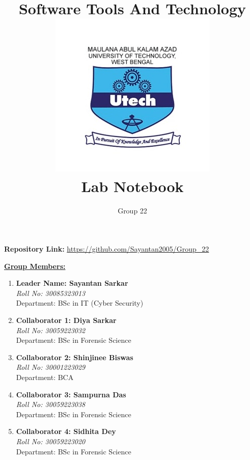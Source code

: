\documentclass[12pt, a4paper]{article}
\title{
    \vspace{-2cm}
    \Huge \textbf{\color{blue!60} Software Tools And Technology}\\[0.5cm]
    \includegraphics[width=0.3\linewidth]{Makaut.png}\\[0.5cm]
    \LARGE \textbf{\color{black} Lab Notebook}
}
\author{
    \vspace{1cm}
    \Large Group 22
}
\date{} %
\begin{document}
\maketitle
{}


\vspace{-1cm}
\begin{center}
    \textbf{Repository Link:} \href{https://github.com/Sayantan2005/Group\_22}{\textcolor{blue!60}{https://github.com/Sayantan2005/Group\_22}}
\end{center}

\vspace{1cm}

\centering
\bfseries{\underline{\Large \textcolor{blue!60}{Group Members:}}}
\vspace{0.5cm}

\begin{flushleft}
\begin{enumerate}
    \item \textbf{Leader Name: Sayantan Sarkar}\\
    \textit{Roll No: 30085323013} \\
    Department: BSc in IT (Cyber Security)
    
    \item \textbf{Collaborator 1: Diya Sarkar} \\
    \textit{Roll No: 30059223032} \\
    Department: BSc in Forensic Science
    
    \item \textbf{Collaborator 2: Shinjinee Biswas} \\
    \textit{Roll No: 30001223029} \\
    Department: BCA
    
    \item \textbf{Collaborator 3: Sampurna Das} \\
    \textit{Roll No: 30059223038} \\
    Department: BSc in Forensic Science
    
    \item \textbf{Collaborator 4: Sidhita Dey} \\
    \textit{Roll No: 30059223020} \\
    Department: BSc in Forensic Science
\end{enumerate}
\end{flushleft}
\end{document}
